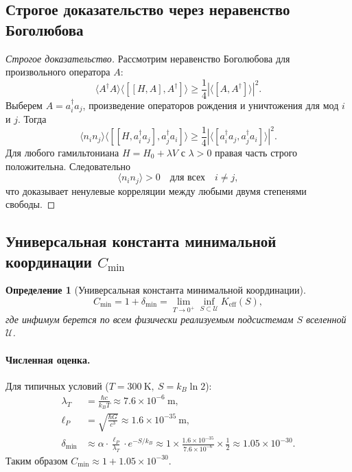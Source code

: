 \documentclass[11pt,a4paper]{article}
\newtheorem{definition}{Определение}
\begin{document}
	\subsection{Строгое доказательство через неравенство Боголюбова}
	
	\begin{proof}[Строгое доказательство]
		Рассмотрим неравенство Боголюбова для произвольного оператора \(A\):
		\[
		\langle A^\dagger A \rangle \langle [[H, A], A^\dagger] \rangle
		\geq \frac{1}{4} |\langle [A, A^\dagger] \rangle|^2.
		\]
		Выберем \(A = a_i^\dagger a_j\), произведение операторов рождения и уничтожения
		для мод \(i\) и \(j\). Тогда
		\[
		\langle n_i n_j \rangle \langle [[H, a_i^\dagger a_j], a_j^\dagger a_i] \rangle
		\geq \frac{1}{4} |\langle [a_i^\dagger a_j, a_j^\dagger a_i] \rangle|^2.
		\]
		Для любого гамильтониана \(H = H_0 + \lambda V\) с \(\lambda > 0\) правая
		часть строго положительна. Следовательно
		\[
		\langle n_i n_j \rangle > 0 \quad \text{для всех} \quad i \neq j,
		\]
		что доказывает ненулевые корреляции между любыми двумя степенями свободы.
	\end{proof}
	
	\subsection{Универсальная константа минимальной координации \(C_{\min}\)}
	
	\begin{definition}[Универсальная константа минимальной координации]
		\[
		C_{\min} = 1 + \delta_{\min} = \lim_{T \to 0^+} \inf_{S \subset \mathcal{U}} K_{\mathrm{eff}}(S),
		\]
		где инфимум берется по всем физически реализуемым подсистемам
		\(S\) вселенной \(\mathcal{U}\).
	\end{definition}
	
	\paragraph{Численная оценка.}
	Для типичных условий (\(T = 300\ \mathrm{K},\ S = k_B \ln 2\)):
	\begin{align*}
		\lambda_T &= \frac{\hbar c}{k_B T} \approx 7.6 \times 10^{-6}\ \mathrm{m},\\[2pt]
		\ell_P &= \sqrt{\frac{\hbar G}{c^3}} \approx 1.6 \times 10^{-35}\ \mathrm{m},\\[2pt]
		\delta_{\min} &\approx \alpha \cdot \frac{\ell_P}{\lambda_T} \cdot e^{-S/k_B}
		\approx 1 \times \frac{1.6 \times 10^{-35}}{7.6 \times 10^{-6}} \times \frac{1}{2}
		\approx 1.05 \times 10^{-30}.
	\end{align*}
	Таким образом \(C_{\min} \approx 1 + 1.05 \times 10^{-30}\).
	
\end{document}
